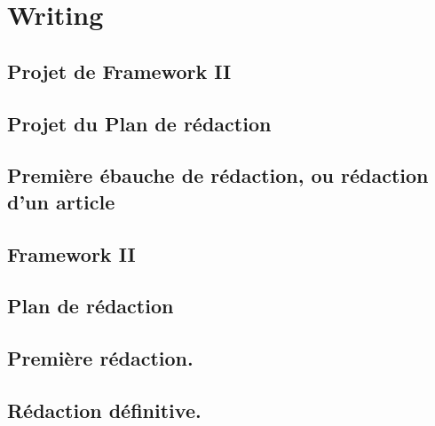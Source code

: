 \documentclass[paper=A4,portrait,twoside=true,twocolumn=false,headinclude=false,footinclude=false,fontsize=11,BCOR=15mm,DIV=calc,pagesize=auto,titlepage=firstiscover,mpinclude=true,headings=big,headings=twolinechapter,open=right,chapterprefix=false,headsepline=false,parskip=full]{scrbook}
\begin{document}
\part{Writing}
\label{sec:org0215341}
\chapter{Projet de Framework II}
\label{sec:orgf723b8b}
\chapter{Projet du Plan de rédaction}
\label{sec:org2f0f3a4}
\chapter{Première ébauche de rédaction, ou rédaction d'un article}
\label{sec:org6c69db7}
\chapter{Framework II}
\label{sec:org80f34fb}
\chapter{Plan de rédaction}
\label{sec:org50f1853}
\chapter{Première rédaction.}
\label{sec:orgc9fbc46}
\chapter{Rédaction définitive.}
\label{sec:org7776910}
\end{document}
